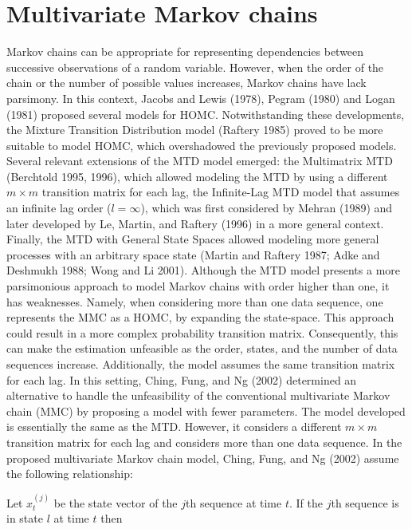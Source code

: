 \hypertarget{multivariate-markov-chains}{%
\section{Multivariate Markov chains}\label{multivariate-markov-chains}}

Markov chains can be appropriate for representing dependencies between successive observations of a random variable. However, when the order of the chain or the number of possible values increases, Markov chains have lack parsimony. In this context, Jacobs and Lewis (1978), Pegram (1980) and Logan (1981) proposed several models for HOMC. Notwithstanding these developments, the Mixture Transition Distribution model (Raftery 1985) proved to be more suitable to model HOMC, which overshadowed the previously proposed models. Several relevant extensions of the MTD model emerged: the Multimatrix MTD (Berchtold 1995, 1996), which allowed modeling the MTD by using a different \(m \times m\) transition matrix for each lag, the Infinite-Lag MTD model that assumes an infinite lag order (\(l = \infty\)), which was first considered by Mehran (1989) and later developed by Le, Martin, and Raftery (1996) in a more general context. Finally, the MTD with General State Spaces allowed modeling more general processes with an arbitrary space state (Martin and Raftery 1987; Adke and Deshmukh 1988; Wong and Li 2001). Although the MTD model presents a more parsimonious approach to model Markov chains with order higher than one, it has weaknesses. Namely, when considering more than one data sequence, one represents the MMC as a HOMC, by expanding the state-space. This approach could result in a more complex probability transition matrix. Consequently, this can make the estimation unfeasible as the order, states, and the number of data sequences increase. Additionally, the model assumes the same transition matrix for each lag. In this setting, Ching, Fung, and Ng (2002) determined an alternative to handle the unfeasibility of the conventional multivariate Markov chain (MMC) by proposing a model with fewer parameters. The model developed is essentially the same as the MTD. However, it considers a different \(m \times m\) transition matrix for each lag and considers more than one data sequence. In the proposed multivariate Markov chain model, Ching, Fung, and Ng (2002) assume the following relationship:

Let \(x_t^{(j)}\) be the state vector of the \(j\)th sequence at time \(t\). If the \(j\)th sequence is in state \(l\) at time \(t\) then

